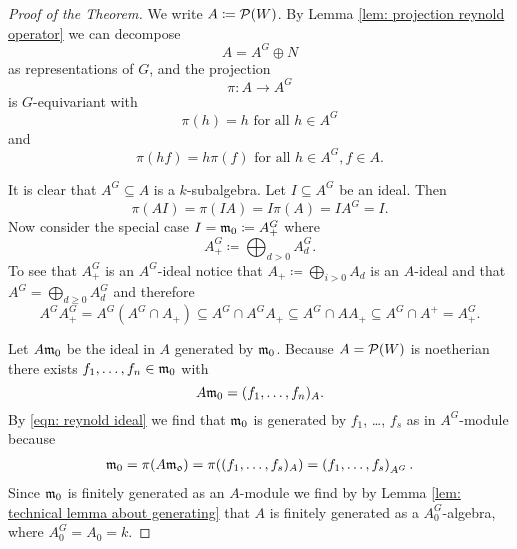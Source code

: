 \begin{proof}[Proof of the Theorem]
 We write $A \coloneqq \mathcal{P}(W)$. By Lemma \ref{lem: projection reynold operator} we can decompose
 \[
  A = A^G \oplus N
 \]
 as representations of $G$, and the projection
 \[
  \pi \colon A \to A^G
 \]
 is $G$-equivariant with
 \[
  \pi(h) = h \text{ for all } h \in A^G
 \]
 and
 \[
  \pi(hf) = h\pi(f) \text{ for all } h \in A^G, f \in A.
 \]
 
 It is clear that $A^G \subseteq A$ is a $k$-subalgebra. Let $I \subseteq A^G$ be an ideal. Then
 \begin{equation}\label{eqn: reynold ideal}
  \pi(A I) = \pi(I A) = I \pi(A) = I A^G = I.
 \end{equation}
 Now consider the special case $I = \mathfrak{m}_0 \coloneqq A^G_+$ where
 \[
  A^G_+ \coloneqq \bigoplus_{d > 0} A^G_d.
 \]
 To see that $A^G_+$ is an $A^G$-ideal notice that $A_+ \coloneqq \bigoplus_{i > 0} A_d$ is an $A$-ideal and that $A^G = \bigoplus_{d \geq 0} A^G_d$ and therefore
 \[
  A^G A^G_+
  = A^G \left(A^G \cap A_+\right)
  \subseteq A^G \cap A^G A_+
  \subseteq A^G \cap A A_+
  \subseteq A^G \cap A^+
  = A^G_+.
 \]
 
 Let $A \mathfrak{m}_0$ be the ideal in $A$ generated by $\mathfrak{m}_0$. Because $A = \mathcal{P}(W)$ is noetherian there exists $f_1, \dotsc, f_n \in \mathfrak{m}_0$ with
 \[
  A \mathfrak{m}_0 = (f_1, \dotsc, f_n)_A.
 \]
 By \eqref{eqn: reynold ideal} we find that $\mathfrak{m}_0$ is generated by $f_1$, \dots, $f_s$ as in $A^G$-module because
 \begin{align*}
  \mathfrak{m}_0
  = \pi(A \mathfrak{m_0})
  = \pi((f_1, \dotsc, f_s)_A)
  = \left( f_1, \dotsc, f_s \right)_{A^G}.
 \end{align*}
 Since $\mathfrak{m}_0$ is finitely generated as an $A$-module we find by by Lemma \ref{lem: technical lemma about generating} that $A$ is finitely generated as a $A_0^G$-algebra, where $A_0^G = A_0 = k$.
\end{proof}




